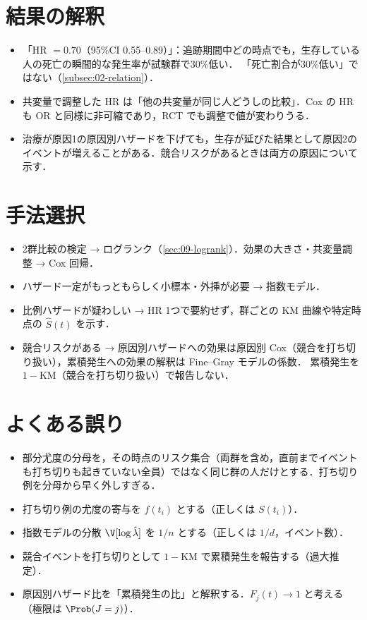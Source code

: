 \section{結果の解釈}\label{sec:10-interp}
\begin{itemize}
\item 「HR $=0.70$（95\%CI 0.55--0.89）」：追跡期間中どの時点でも，生存している人の死亡の瞬間的な発生率が試験群で30\%低い．
      「死亡割合が30\%低い」ではない（\cref{subsec:02-relation}）．
\item 共変量で調整した HR は「他の共変量が同じ人どうしの比較」．Cox の HR も OR と同様に非可縮であり，RCT でも調整で値が変わりうる．
\item 治療が原因1の原因別ハザードを下げても，生存が延びた結果として原因2のイベントが増えることがある．競合リスクがあるときは両方の原因について示す．
\end{itemize}

\section{手法選択}\label{sec:10-choice}
\begin{itemize}
\item 2群比較の検定 → ログランク（\cref{sec:09-logrank}）．効果の大きさ・共変量調整 → Cox 回帰．
\item ハザード一定がもっともらしく小標本・外挿が必要 → 指数モデル．
\item 比例ハザードが疑わしい → HR 1つで要約せず，群ごとの KM 曲線や特定時点の $\hat S(t)$ を示す．
\item 競合リスクがある → 原因別ハザードへの効果は原因別 Cox（競合を打ち切り扱い），累積発生への効果の解釈は Fine--Gray モデルの係数．
      累積発生を $1-\mathrm{KM}$（競合を打ち切り扱い）で報告しない．
\end{itemize}

\section{よくある誤り}\label{sec:10-err}
\begin{warnbox}
\begin{itemize}
\item 部分尤度の分母を，その時点のリスク集合（両群を含め，直前までイベントも打ち切りも起きていない全員）ではなく同じ群の人だけとする．打ち切り例を分母から早く外しすぎる．
\item 打ち切り例の尤度の寄与を $f(t_i)$ とする（正しくは $S(t_i)$）．
\item 指数モデルの分散 $\V[\log\hat\lambda]$ を $1/n$ とする（正しくは $1/d$，イベント数）．
\item 競合イベントを打ち切りとして $1-\mathrm{KM}$ で累積発生を報告する（過大推定）．
\item 原因別ハザード比を「累積発生の比」と解釈する．$F_j(t)\to1$ と考える（極限は $\Prob(J=j)$）．
\end{itemize}
\end{warnbox}

